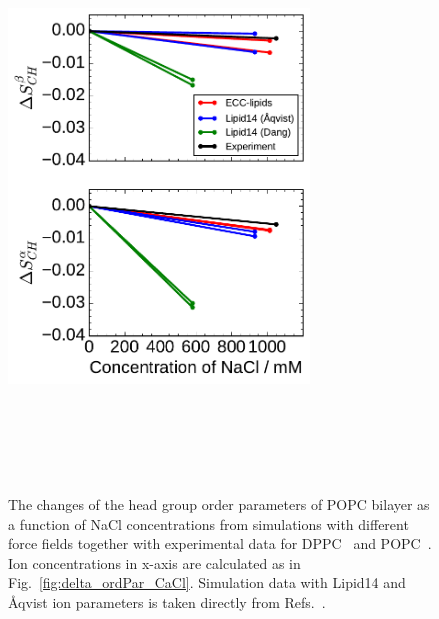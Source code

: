 \documentclass[aip,jcp,twocolumn]{revtex4}
\begin{document}
\begin{figure}[tbp]
  \centering
  \includegraphics[width=8.0cm]{../Fig/ipython_nb/OrdPars-A-B_L14-ECCL17_q80_sig89_NaCl.pdf}
  \caption{\label{fig:delta_ordPar_NaCl}
    The changes of the head group order parameters of POPC bilayer as a function of NaCl concentrations
    from simulations with different force fields together with experimental data for DPPC~\cite{akutsu81} and POPC~\cite{altenbach84}.
    Ion concentrations in x-axis are calculated as in Fig.~\ref{fig:delta_ordPar_CaCl}.
    Simulation data with Lipid14 and \AA{}qvist ion parameters is taken directly from
    Refs.~\cite{lipid14POPC0mMNaClfiles,lipid14POPC1000mMNaClfiles}.
  }
   \\
   \\
   \\
   \\
\end{figure}
\end{document}
